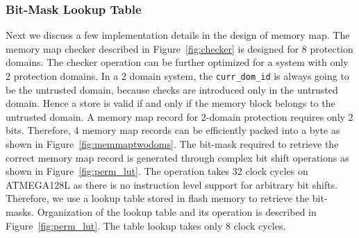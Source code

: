 \subsubsection{Bit-Mask Lookup Table}
\label{sec:bitmasklut}
%
Next we discuss a few implementation details in the design of
memory map.
%
The memory map checker described in Figure~\ref{fig:checker} is
designed for 8 protection domains.
%
The checker operation can be further optimized for a system with only 2
protection domains.
%
In a 2 domain system, the \texttt{curr\_dom\_id} is always going to be
the untrusted domain, because checks are introduced only in the
untrusted domain.
%
Hence a store is valid if and only if the memory block belongs to the untrusted
domain.
%
A memory map record for 2-domain protection requires only 2 bits.
%
Therefore, 4 memory map records can be efficiently packed into a byte
as shown in Figure~\ref{fig:memmaptwodoms}.
%
The bit-mask required to retrieve the correct memory map record is
generated through complex bit shift operations as shown in
Figure~\ref{fig:perm_lut}.
%
The operation takes 32 clock cycles on ATMEGA128L as there is no
instruction level support for arbitrary bit shifts.
%
Therefore, we use a lookup table stored in flash memory to retrieve
the bit-masks.
%
Organization of the lookup table and its operation is described in
Figure~\ref{fig:perm_lut}.
%
The table lookup takes only 8 clock cycles.
%
